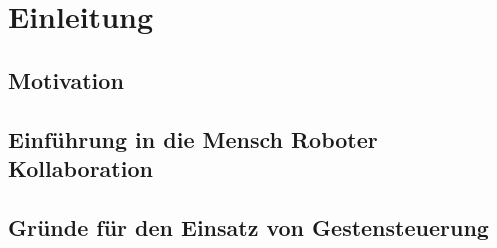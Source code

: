 \chapter{Einleitung}

\section{Motivation}

\section{Einführung in die Mensch Roboter Kollaboration}

\section{Gründe für den Einsatz von Gestensteuerung}
